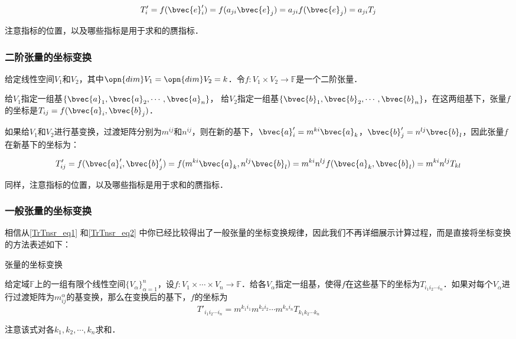 \begin{equation}\label{TrTnsr_eq1}
T'_{i}=f(\bvec{e}'_i)=f(a_{ji}\bvec{e}_j)=a_{ji}f(\bvec{e}_j)=a_{ji}T_{j}
\end{equation}

注意指标的位置，以及哪些指标是用于求和的赝指标．

\subsubsection{二阶张量的坐标变换}

给定线性空间$V_1$和$V_2$，其中$\opn{dim}V_1=\opn{dim}V_2=k$．令$f:V_1\times V_2\rightarrow\mathbb{F}$是一个二阶张量．

给$V_1$指定一组基$\{\bvec{a}_1, \bvec{a}_2, \cdots, \bvec{a}_n\}$， 给$V_2$指定一组基$\{\bvec{b}_1, \bvec{b}_2, \cdots, \bvec{b}_n\}$，在这两组基下，张量$f$的坐标是$T_{ij}=f(\bvec{a}_i, \bvec{b}_j)$．

如果给$V_1$和$V_2$进行基变换，过渡矩阵分别为$m^{ij}$和$n^{ij}$，则在新的基下，$\bvec{a}'_i=m^{ki}\bvec{a}_k$，$\bvec{b}'_j=n^{lj}\bvec{b}_l$，因此张量$f$在新基下的坐标为：

\begin{equation}\label{TrTnsr_eq2}
T'_{ij}=f(\bvec{a}'_i, \bvec{b}'_j)=f(m^{ki}\bvec{a}_k, n^{lj}\bvec{b}_l)=m^{ki}n^{lj}f(\bvec{a}_k, \bvec{b}_l)=m^{ki}n^{lj}T_{kl}
\end{equation}

同样，注意指标的位置，以及哪些指标是用于求和的赝指标．

\subsubsection{一般张量的坐标变换}

相信从\autoref{TrTnsr_eq1} 和\autoref{TrTnsr_eq2} 中你已经比较得出了一般张量的坐标变换规律，因此我们不再详细展示计算过程，而是直接将坐标变换的方法表述如下：

\begin{theorem}{张量的坐标变换}

给定域$\mathbb{F}$上的一组有限个线性空间$\{V_\alpha\}^n_{\alpha=1}$，设$f:V_1\times\cdots\times V_n\rightarrow\mathbb{F}$．给各$V_\alpha$指定一组基，使得$f$在这些基下的坐标为$T_{i_1i_2\cdots i_n}$．如果对每个$V_\alpha$进行过渡矩阵为$m^\alpha_{ij}$的基变换，那么在变换后的基下，$f$的坐标为
\begin{equation}
T'_{i_1i_2\cdots i_n}=m^{k_1i_1}m^{k_2i_2}\cdots m^{k_ni_n}T_{k_1k_2\cdots k_n}
\end{equation}

注意该式对各$k_1, k_2, \cdots, k_n$求和．
\end{theorem}

